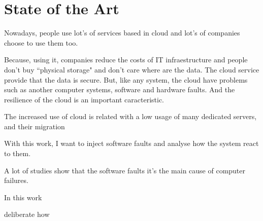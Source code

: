 \section{State of the Art}

Nowadays, people use lot's of services based in cloud and lot's of companies choose to use them too.

Because, using it, companies reduce the costs of IT infraestructure and people don't buy ``physical storage" and don't care where are the data. The cloud service provide that the data is secure.
But, like any system, the cloud have problems such as another computer systems, software and hardware faults. And the resilience of the cloud is an important caracteristic.

The increased use of cloud is related with a low usage of many dedicated servers, and their migration 



With this work, I want to inject software faults and analyse how the system react to them.

A lot of studies show that the software faults it's the main cause of computer failures.

In this work

deliberate how 



\cite{duraes2006emulation}
\cite{wolter2012resilience}
\cite{avizzienisbasic}

